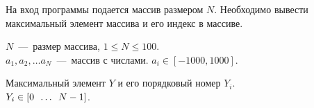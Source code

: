 На вход программы подается массив размером $N$. Необходимо вывести максимальный элемент массива и его индекс в массиве.

\InputFile

\noindent
$N$~---~размер массива, $1 \leq N \leq 100$. \\
$a_1, a_2, \ldots a_N$~---~массив с числами. $ a_i \in [-1000, 1000]$. 

\OutputFile

\noindent
Максимальный элемент $Y$ и его порядковый номер $Y_i$. \\
$Y_i \in [0 \enskip \ldots \enskip N - 1]$.

\SAMPLES

